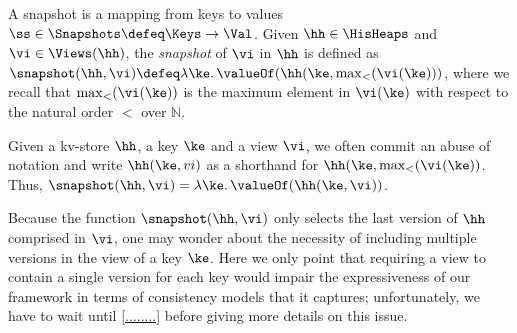 \begin{definition}[Snapshots]
\label{def:heaps}
\label{def:snapshot}
A snapshot is a mapping from keys to values \( \ss \in \Snapshots  \defeq \Keys \to \Val\).
Given $\hh \in \HisHeaps$ and $\vi \in \Views(\hh)$, the \emph{snapshot} of $\vi$ in 
$\hh$ is defined as $\snapshot(\hh, \vi) \defeq \lambda \ke \ldotp \valueOf(\hh(\ke, \max_{<}(\vi(\ke)))$, 
where we recall that $\max_{<}(\vi(\ke))$ is the maximum element in $\vi(\ke)$ with respect to the natural 
order $<$ over $\mathbb{N}$.
\end{definition}
Given a kv-store $\hh$, a key $\ke$ and a view $\vi$, we often commit an abuse of notation and write 
$\hh(\ke, vi)$ as a shorthand for 
$\hh(\ke, \max_{<}(\vi(\ke))$. Thus, $\snapshot(\hh, \vi) = \lambda \ke \ldotp \valueOf(\hh(\ke, \vi))$. 

\begin{remark}
Because the function $\snapshot(\hh, \vi)$ only selects the last version of $\hh$ comprised 
in $\vi$, one may wonder about the necessity of including multiple versions in the view of a 
key $\ke$.  Here we only point that requiring a view to contain a single version for each key 
would impair the expressiveness of our framework in terms of consistency models that it captures; 
unfortunately, we have to wait until \cref{........} before giving more details on this issue.
\end{remark}

%  
%



